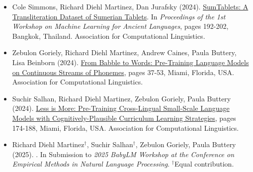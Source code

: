 \begin{tcolorbox}
\begin{itemize}
    \item Cole Simmons, Richard Diehl Martinez, Dan Jurafsky (2024). {\color{thesisblue}\href{https://aclanthology.org/2024.ml4al-1.20/}{SumTablets: A Transliteration Dataset of Sumerian Tablets}}. In \emph{Proceedings of the 1st Workshop on Machine Learning for Ancient Languages}, pages 192-202, Bangkok, Thailand. Association for Computational Linguistics.
    \item Zebulon Goriely, Richard Diehl Martinez, Andrew Caines, Paula Buttery, Lisa Beinborn (2024). {\color{thesisblue}\href{https://aclanthology.org/2024.conll-babylm.4/}{From Babble to Words: Pre-Training Language Models on Continuous Streams of Phonemes}}, pages 37-53, Miami, Florida, USA. Association for Computational Linguistics.
    \item Suchir Salhan, Richard Diehl Martinez, Zebulon Goriely, Paula Buttery (2024). {\color{thesisblue}\href{https://aclanthology.org/2024.conll-babylm.15/}{Less is More: Pre-Training Cross-Lingual Small-Scale Language Models with Cognitively-Plausible Curriculum Learning Strategies}}, pages 174-188, Miami, Florida, USA. Association for Computational Linguistics.
    \item  Richard Diehl Martinez$^{\dagger}$, Suchir Salhan$^{\dagger}$, Zebulon Goriely, Paula Buttery (2025). {}. In Submission to \emph{2025 BabyLM Workshop at the Conference on Empirical Methods in Natural Language Processing}. $^{\dagger}$Equal contribution.
\end{itemize}
\end{tcolorbox}